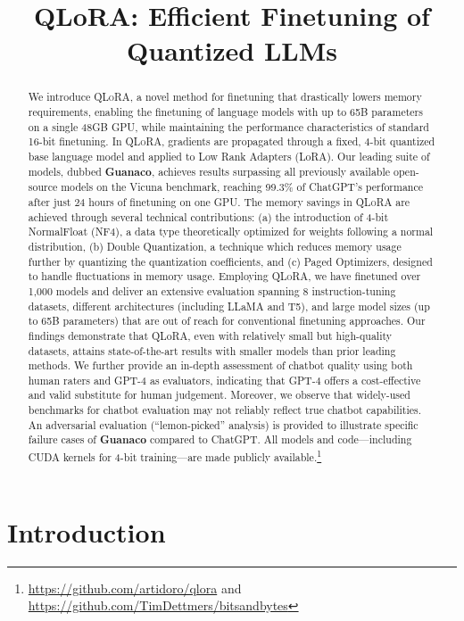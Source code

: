 \title{QLoRA: Efficient Finetuning of Quantized LLMs}

\begin{abstract}
We introduce \textsc{QLoRA}, a novel method for finetuning that drastically lowers memory requirements, enabling the finetuning of language models with up to 65B parameters on a single 48GB GPU, while maintaining the performance characteristics of standard 16-bit finetuning. In \textsc{QLoRA}, gradients are propagated through a fixed, 4-bit quantized base language model and applied to Low Rank Adapters (LoRA). Our leading suite of models, dubbed \textbf{Guanaco}, achieves results surpassing all previously available open-source models on the Vicuna benchmark, reaching 99.3\% of ChatGPT's performance after just 24 hours of finetuning on one GPU. The memory savings in \textsc{QLoRA} are achieved through several technical contributions: (a) the introduction of 4-bit NormalFloat (NF4), a data type theoretically optimized for weights following a normal distribution, (b) Double Quantization, a technique which reduces memory usage further by quantizing the quantization coefficients, and (c) Paged Optimizers, designed to handle fluctuations in memory usage. Employing \textsc{QLoRA}, we have finetuned over 1,000 models and deliver an extensive evaluation spanning 8 instruction-tuning datasets, different architectures (including LLaMA and T5), and large model sizes (up to 65B parameters) that are out of reach for conventional finetuning approaches. Our findings demonstrate that QLoRA, even with relatively small but high-quality datasets, attains state-of-the-art results with smaller models than prior leading methods. We further provide an in-depth assessment of chatbot quality using both human raters and GPT-4 as evaluators, indicating that GPT-4 offers a cost-effective and valid substitute for human judgement. Moreover, we observe that widely-used benchmarks for chatbot evaluation may not reliably reflect true chatbot capabilities. An adversarial evaluation (“lemon-picked” analysis) is provided to illustrate specific failure cases of \textbf{Guanaco} compared to ChatGPT. All models and code—including CUDA kernels for 4-bit training—are made publicly available.\footnote{\url{https://github.com/artidoro/qlora} and \url{https://github.com/TimDettmers/bitsandbytes}}
\end{abstract}

\section{Introduction}

